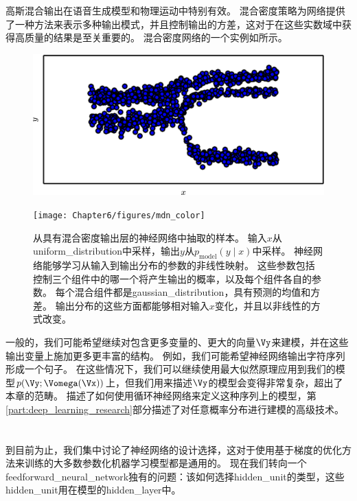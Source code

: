 
高斯混合输出在语音生成模型\citep{Schuster-1999}和物理运动\citep{Graves-2013}中特别有效。
混合密度策略为网络提供了一种方法来表示多种输出模式，并且控制输出的方差，这对于在这些实数域中获得高质量的结果是至关重要的。
混合密度网络的一个实例如所示。
\begin{figure}[!htb]
\ifOpenSource
\centerline{\includegraphics[scale=0.5]{images/46.png}}
\else
\centerline{\texttt{[image: Chapter6/figures/mdn\_color]}}
\fi
\captionsetup{singlelinecheck=off}
\caption{从具有混合密度输出层的神经网络中抽取的样本。
输入$x$从\gls{uniform_distribution}中采样，输出$y$从$p_{\text{model}}(y\mid x)$中采样。 神经网络能够学习从输入到输出分布的参数的非线性映射。 这些参数包括控制三个组件中的哪一个将产生输出的概率，以及每个组件各自的参数。
每个混合组件都是\gls{gaussian_distribution}，具有预测的均值和方差。 输出分布的这些方面都能够相对输入$x$变化，并且以非线性的方式改变。}
\label{fig:chap6_mdn_color}
\end{figure}


一般的，我们可能希望继续对包含更多变量的、更大的向量$\Vy$来建模，并在这些输出变量上施加更多更丰富的结构。
例如，我们可能希望神经网络输出字符序列形成一个句子。
在这些情况下，我们可以继续使用最大似然原理应用到我们的模型$p(\Vy;\Vomega(\Vx))$上，但我们用来描述$\Vy$的模型会变得非常复杂，超出了本章的范畴。
描述了如何使用循环神经网络来定义这种序列上的模型，第\ref{part:deep_learning_research}部分描述了对任意概率分布进行建模的高级技术。

\section{}
\label{sec:hidden_units}

到目前为止，我们集中讨论了神经网络的设计选择，这对于使用基于梯度的优化方法来训练的大多数参数化机器学习模型都是通用的。
现在我们转向一个\gls{feedforward_neural_network}独有的问题：该如何选择\gls{hidden_unit}的类型，这些\gls{hidden_unit}用在模型的\gls{hidden_layer}中。

